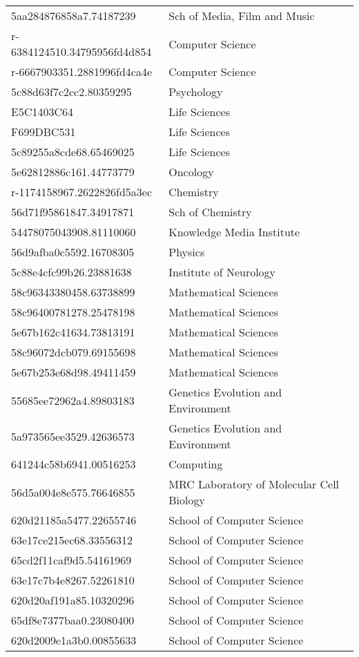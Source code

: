 \begin{tabular}{ll}
5aa284876858a7.74187239 & Sch of Media, Film and Music \\
r-6384124510.34795956fd4d854 & Computer Science \\
r-6667903351.2881996fd4ca4e & Computer Science \\
5c88d63f7c2cc2.80359295 & Psychology \\
E5C1403C64 & Life Sciences \\
F699DBC531 & Life Sciences \\
5c89255a8cde68.65469025 & Life Sciences \\
5e62812886c161.44773779 & Oncology \\
r-1174158967.2622826fd5a3ec & Chemistry \\
56d71f95861847.34917871 & Sch of Chemistry \\
54478075043908.81110060 & Knowledge Media Institute \\
56d9afba0c5592.16708305 & Physics \\
5c88e4cfc99b26.23881638 & Institute of Neurology \\
58c96343380458.63738899 & Mathematical Sciences \\
58c96400781278.25478198 & Mathematical Sciences \\
5e67b162c41634.73813191 & Mathematical Sciences \\
58c96072dcb079.69155698 & Mathematical Sciences \\
5e67b253e68d98.49411459 & Mathematical Sciences \\
55685ee72962a4.89803183 & Genetics Evolution and Environment \\
5a973565ee3529.42636573 & Genetics Evolution and Environment \\
641244c58b6941.00516253 & Computing \\
56d5a004e8e575.76646855 & MRC Laboratory of Molecular Cell Biology \\
620d21185a5477.22655746 & School of Computer Science \\
63e17ce215ec68.33556312 & School of Computer Science \\
65cd2f11caf9d5.54161969 & School of Computer Science \\
63e17c7b4e8267.52261810 & School of Computer Science \\
620d20af191a85.10320296 & School of Computer Science \\
65df8e7377baa0.23080400 & School of Computer Science \\
620d2009e1a3b0.00855633 & School of Computer Science \\

\end{tabular}
